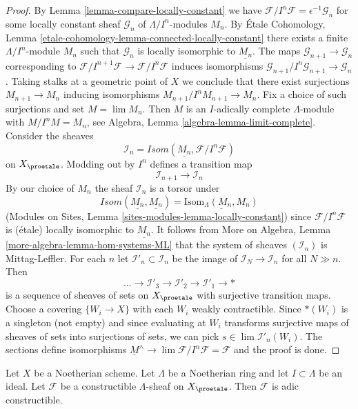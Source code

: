 \begin{proof}
By Lemma \ref{lemma-compare-locally-constant} we have
$\mathcal{F}/I^n\mathcal{F} = \epsilon^{-1}\mathcal{G}_n$
for some locally constant sheaf $\mathcal{G}_n$ of $\Lambda/I^n$-modules
$M_n$. By
\'Etale  Cohomology, Lemma
\ref{etale-cohomology-lemma-connected-locally-constant}
there exists a finite $\Lambda/I^n$-module $M_n$ such that
$\mathcal{G}_n$ is locally isomorphic to $\underline{M_n}$.
The maps $\mathcal{G}_{n + 1} \to \mathcal{G}_n$
corresponding to
$\mathcal{F}/I^{n + 1}\mathcal{F} \to \mathcal{F}/I^n\mathcal{F}$
induces isomorphisms
$\mathcal{G}_{n + 1}/I^n\mathcal{G}_{n + 1} \to \mathcal{G}_n$.
Taking stalks at a geometric point of $X$ we conclude that there
exist surjections $M_{n + 1} \to M_n$ inducing isomorphisms
$M_{n + 1}/I^nM_{n + 1} \to M_n$. Fix a choice of such surjections
and set $M = \lim M_n$. Then $M$ is an $I$-adically complete
$\Lambda$-module with $M/I^nM = M_n$, see
Algebra, Lemma \ref{algebra-lemma-limit-complete}.
Consider the sheaves
$$
\mathcal{I}_n = \mathit{Isom}(\underline{M_n}, \mathcal{F}/I^n\mathcal{F})
$$
on $X_\proetale$. Modding out by $I^n$ defines a transition map
$$
\mathcal{I}_{n + 1} \longrightarrow \mathcal{I}_n
$$
By our choice of $M_n$ the sheaf $\mathcal{I}_n$ is a torsor under
$$
\mathit{Isom}(\underline{M_n}, \underline{M_n}) =
\underline{\text{Isom}_\Lambda(M_n, M_n)}
$$
(Modules on Sites, Lemma \ref{sites-modules-lemma-locally-constant})
since $\mathcal{F}/I^n\mathcal{F}$ is (\'etale) locally isomorphic
to $\underline{M_n}$. It follows from
More on Algebra, Lemma \ref{more-algebra-lemma-hom-systems-ML}
that the system of sheaves $(\mathcal{I}_n)$ is Mittag-Leffler.
For each $n$ let $\mathcal{I}'_n \subset \mathcal{I}_n$ be the
image of $\mathcal{I}_N \to \mathcal{I}_n$ for all $N \gg n$.
Then
$$
\ldots \to \mathcal{I}'_3 \to \mathcal{I}'_2 \to \mathcal{I}'_1 \to *
$$
is a sequence of sheaves of sets on $X_\proetale$ with surjective
transition maps. Choose a covering $\{W_i \to X\}$ with
each $W_i$ weakly contractible. Since $*(W_i)$ is a singleton (not empty)
and since evaluating at $W_i$ transforms surjective maps of sheaves of sets
into surjections of sets, we can pick
$s \in \lim \mathcal{I}'_n(W_i)$. The sections define isomorphisms
$\underline{M}^\wedge \to \lim \mathcal{F}/I^n\mathcal{F} = \mathcal{F}$
and the proof is done.
\end{proof}

\begin{lemma}
\label{lemma-Noetherian-adic-constructible}
Let $X$ be a Noetherian scheme. Let $\Lambda$ be a Noetherian ring and
let $I \subset \Lambda$ be an ideal. Let $\mathcal{F}$ be a
constructible $\Lambda$-sheaf on $X_\proetale$. Then $\mathcal{F}$
is adic constructible.
\end{lemma}

